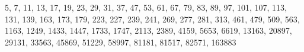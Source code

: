 5, 7, 11, 13, 17, 19, 23, 29, 31, 37, 47, 53, 61, 67, 79, 83, 89, 97, 101, 107, 113, 131, 139, 163, 173, 179, 223, 227, 239, 241, 269, 277, 281, 313, 461, 479, 509, 563, 1163, 1249, 1433, 1447, 1733, 1747, 2113, 2389, 4159, 5653, 6619, 13163, 20897, 29131, 33563, 45869, 51229, 58997, 81181, 81517, 82571, 163883